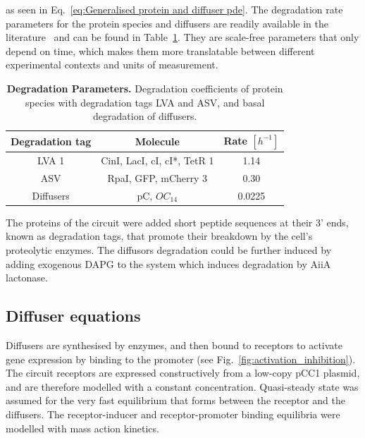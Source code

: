 as seen in Eq.~\ref{eq:Generalised protein and diffuser pde}.
The degradation rate parameters for the protein species and diffusers are readily available in the literature~\parencite{Andersen1998, kaufmann2005revisiting} and can be found in Table~\ref{table:degradation table}.
They are scale-free parameters that only depend on time, which makes them more translatable between different experimental contexts and units of measurement.



\begin{table}[H]
    \centering
    \begin{tabular}{|c|c|c|}
        \hline
        \textbf{Degradation tag} & \textbf{Molecule} & \textbf{Rate $[h^{-1}]$} \\
        \hline
        LVA 1 & CinI, LacI, cI, cI*, TetR 1 & 1.14 \\
        \hline
        ASV & RpaI, GFP, mCherry 3 & 0.30 \\
        \hline
        Diffusers & pC, $OC_{14}$ & 0.0225 \\
        \hline
    \end{tabular}
    \caption{\textbf{Degradation Parameters.} Degradation coefficients of protein species with degradation tags LVA and ASV, and basal degradation of diffusers.}
    \label{table:degradation table}
\end{table}

The proteins of the circuit were added short peptide sequences at their 3’ ends, known as degradation tags, that promote their breakdown by the cell’s proteolytic enzymes.
The diffusors degradation could be further induced by adding exogenous DAPG to the system which induces degradation by AiiA lactonase.

\subsection{Diffuser equations}
Diffusers are synthesised by enzymes, and then bound to receptors to activate gene expression by binding to the promoter (see Fig.~\ref{fig:activation_inhibition}). %
The circuit receptors are expressed constructively from a low-copy pCC1 plasmid, and are therefore modelled with a constant concentration.
Quasi-steady state was assumed for the very fast equilibrium that forms between the receptor and the diffusers.
The receptor-inducer and receptor-promoter binding equilibria were modelled with mass action kinetics.

